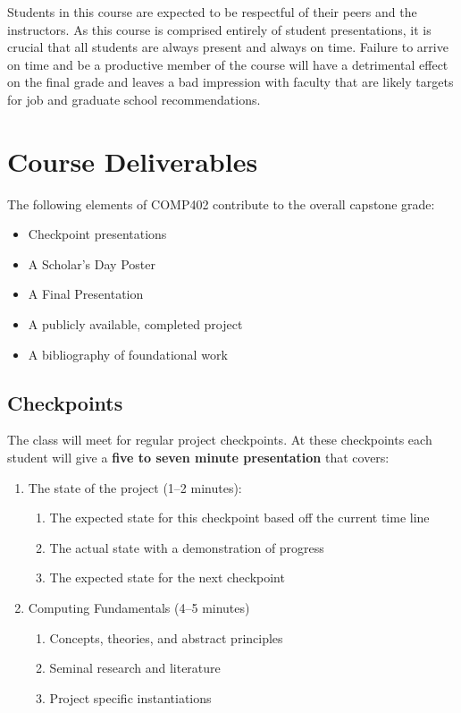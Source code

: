\documentclass[nobib]{tufte-handout}
\begin{document}
Students in this course are expected to be respectful of their peers and the instructors. As this course is comprised entirely of student presentations, it is crucial that all students are always present and always on time.  Failure to arrive on time and be a productive member of the course will have a detrimental effect on the final grade and leaves a bad impression with faculty that are likely targets for job and graduate school recommendations.

\section{Course Deliverables}

The following elements of COMP402 contribute to the overall capstone grade:
\begin{itemize}
\item Checkpoint presentations
\item A Scholar's Day Poster
\item A Final Presentation
\item A publicly available, completed project
\item A bibliography of foundational work
\end{itemize}


\subsection{Checkpoints}

The class will meet for regular project checkpoints. At these checkpoints each student will give a \textbf{five to seven minute presentation} that covers:
\begin{enumerate}
\item The state of the project (1--2 minutes):
\begin{enumerate}
\item The expected state for this checkpoint based off the current time line
\item The actual state with a demonstration of progress
\item The expected state for the next checkpoint
\end{enumerate}
\item Computing Fundamentals (4--5 minutes)
\begin{enumerate}
\item Concepts, theories, and abstract principles
\item Seminal research and literature
\item Project specific instantiations
\end{enumerate}
\end{enumerate}
\end{document}
